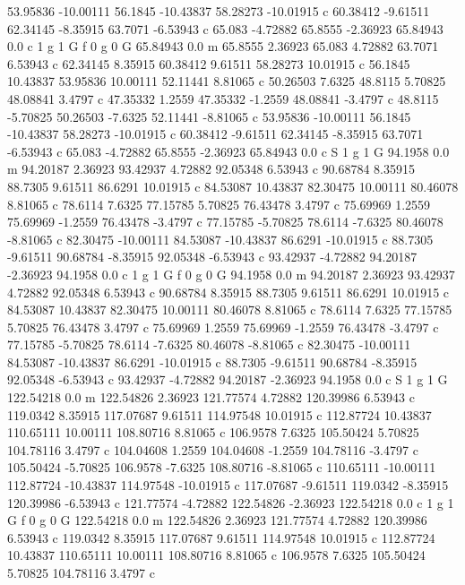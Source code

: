 53.95836 -10.00111 
56.1845 -10.43837 
58.28273 -10.01915 c 
60.38412 -9.61511 
62.34145 -8.35915 
63.7071 -6.53943 c 
65.083 -4.72882 
65.8555 -2.36923 
65.84943 0.0 c 
1 g 1 G f 
0 g 0 G 
65.84943 0.0 m 
65.8555 2.36923 
65.083 4.72882 
63.7071 6.53943 c 
62.34145 8.35915 
60.38412 9.61511 
58.28273 10.01915 c 
56.1845 10.43837 
53.95836 10.00111 
52.11441 8.81065 c 
50.26503 7.6325 
48.8115 5.70825 
48.08841 3.4797 c 
47.35332 1.2559 
47.35332 -1.2559 
48.08841 -3.4797 c 
48.8115 -5.70825 
50.26503 -7.6325 
52.11441 -8.81065 c 
53.95836 -10.00111 
56.1845 -10.43837 
58.28273 -10.01915 c 
60.38412 -9.61511 
62.34145 -8.35915 
63.7071 -6.53943 c 
65.083 -4.72882 
65.8555 -2.36923 
65.84943 0.0 c 
S 
1 g 1 G 
94.1958 0.0 m 
94.20187 2.36923 
93.42937 4.72882 
92.05348 6.53943 c 
90.68784 8.35915 
88.7305 9.61511 
86.6291 10.01915 c 
84.53087 10.43837 
82.30475 10.00111 
80.46078 8.81065 c 
78.6114 7.6325 
77.15785 5.70825 
76.43478 3.4797 c 
75.69969 1.2559 
75.69969 -1.2559 
76.43478 -3.4797 c 
77.15785 -5.70825 
78.6114 -7.6325 
80.46078 -8.81065 c 
82.30475 -10.00111 
84.53087 -10.43837 
86.6291 -10.01915 c 
88.7305 -9.61511 
90.68784 -8.35915 
92.05348 -6.53943 c 
93.42937 -4.72882 
94.20187 -2.36923 
94.1958 0.0 c 
1 g 1 G f 
0 g 0 G 
94.1958 0.0 m 
94.20187 2.36923 
93.42937 4.72882 
92.05348 6.53943 c 
90.68784 8.35915 
88.7305 9.61511 
86.6291 10.01915 c 
84.53087 10.43837 
82.30475 10.00111 
80.46078 8.81065 c 
78.6114 7.6325 
77.15785 5.70825 
76.43478 3.4797 c 
75.69969 1.2559 
75.69969 -1.2559 
76.43478 -3.4797 c 
77.15785 -5.70825 
78.6114 -7.6325 
80.46078 -8.81065 c 
82.30475 -10.00111 
84.53087 -10.43837 
86.6291 -10.01915 c 
88.7305 -9.61511 
90.68784 -8.35915 
92.05348 -6.53943 c 
93.42937 -4.72882 
94.20187 -2.36923 
94.1958 0.0 c 
S 
1 g 1 G 
122.54218 0.0 m 
122.54826 2.36923 
121.77574 4.72882 
120.39986 6.53943 c 
119.0342 8.35915 
117.07687 9.61511 
114.97548 10.01915 c 
112.87724 10.43837 
110.65111 10.00111 
108.80716 8.81065 c 
106.9578 7.6325 
105.50424 5.70825 
104.78116 3.4797 c 
104.04608 1.2559 
104.04608 -1.2559 
104.78116 -3.4797 c 
105.50424 -5.70825 
106.9578 -7.6325 
108.80716 -8.81065 c 
110.65111 -10.00111 
112.87724 -10.43837 
114.97548 -10.01915 c 
117.07687 -9.61511 
119.0342 -8.35915 
120.39986 -6.53943 c 
121.77574 -4.72882 
122.54826 -2.36923 
122.54218 0.0 c 
1 g 1 G f 
0 g 0 G 
122.54218 0.0 m 
122.54826 2.36923 
121.77574 4.72882 
120.39986 6.53943 c 
119.0342 8.35915 
117.07687 9.61511 
114.97548 10.01915 c 
112.87724 10.43837 
110.65111 10.00111 
108.80716 8.81065 c 
106.9578 7.6325 
105.50424 5.70825 
104.78116 3.4797 c 
